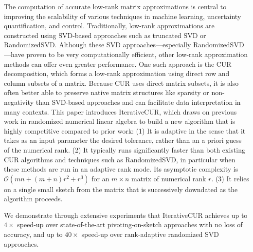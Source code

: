 The computation of accurate low-rank matrix approximations is central to improving the scalability of various techniques in machine learning, uncertainty quantification, and control. Traditionally, low-rank approximations are constructed using SVD-based approaches such as truncated SVD or RandomizedSVD. Although these SVD approaches---especially RandomizedSVD---have proven to be very computationally efficient, other low-rank approximation methods can offer even greater performance. One such approach is the CUR decomposition, which forms a low-rank approximation using direct row and column subsets of a matrix. Because CUR uses direct matrix subsets, it is also often better able to preserve native matrix structures like sparsity or non-negativity than SVD-based approaches and can facilitate data interpretation in many contexts. This paper introduces IterativeCUR, which draws on previous work in randomized numerical linear algebra to build a new algorithm that is highly competitive compared to prior work:
(1) It is adaptive in the sense that it takes as an input parameter the desired tolerance, rather than an a priori guess of the numerical rank.
(2) It typically runs significantly faster than both existing CUR algorithms and techniques such as RandomizedSVD, in particular when these methods are run in an adaptive rank mode. Its asymptotic complexity is  $\mathcal{O}(mn + (m+n)r^2 + r^3)$ for an $m\times n$ matrix of numerical rank $r$.
(3) It relies on a single small sketch from the matrix that is successively downdated as the algorithm proceeds.

We demonstrate through extensive experiments that IterativeCUR achieves up to $4\times$ speed-up over state-of-the-art pivoting-on-sketch approaches with no loss of accuracy, and up to $40\times$ speed-up over rank-adaptive randomized SVD approaches.